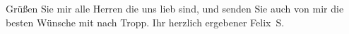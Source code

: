 \pstart
           Grüßen Sie mir alle Herren die uns lieb sind, und senden Sie auch von mir die besten
               Wünsche mit nach Tropp.\pend
           \pstart  Ihr herzlich ergebener \spacefill\mbox{Felix S.}\pend{}\endnumbering{}  
      